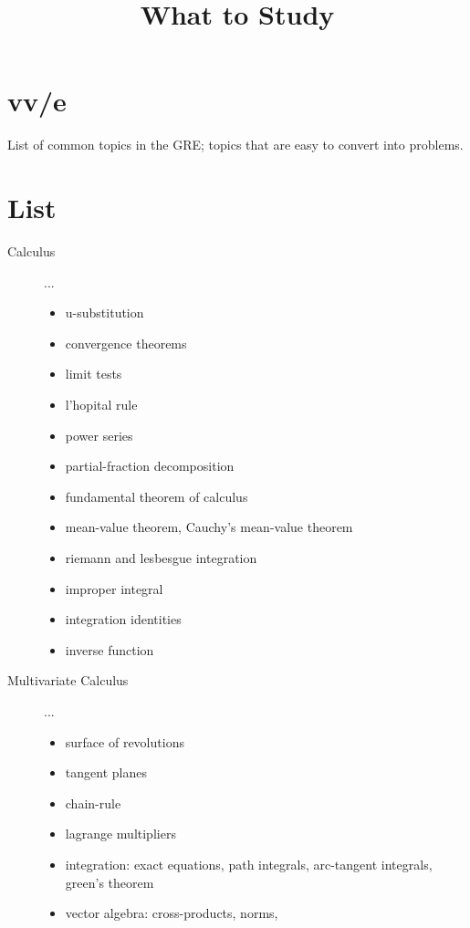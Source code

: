 \documentclass[10pt,twoside,a4paper]{article}
\title{What to Study}
\begin{document}
\section*{vv/e}

List of common topics in the GRE; topics that are easy to convert into problems.

\section*{List}

\small


\begin{description}
  \item[Calculus] ...
    \begin{itemize}
      \item u-substitution
      \item convergence theorems
      \item limit tests
      \item l'hopital rule
      \item power series
      \item partial-fraction decomposition
      \item fundamental theorem of calculus
      \item mean-value theorem, Cauchy's mean-value theorem
      \item riemann and lesbesgue integration
      \item improper integral
      \item integration identities
      \item inverse function
    \end{itemize}

  \item[Multivariate Calculus] ...
    \begin{itemize}
      \item surface of revolutions
      \item tangent planes
      \item chain-rule
      \item lagrange multipliers
      \item integration: exact equations, path integrals, arc-tangent integrals, green's theorem
      \item vector algebra: cross-products, norms, 
    \end{itemize}


\end{description}
\end{document}
